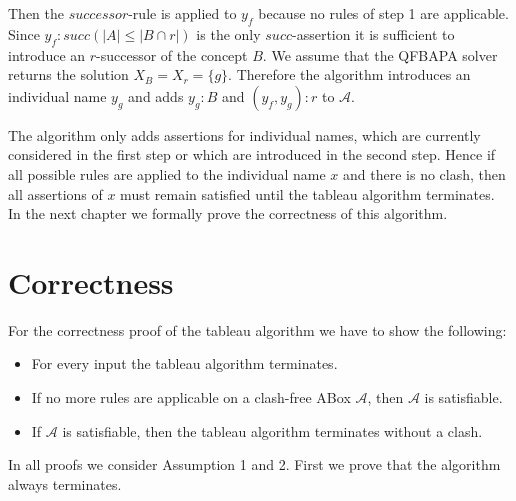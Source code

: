 \documentclass{book}
\theoremstyle{break}
\theoremstyle{definition}
\begin{document}
Then the $successor$-rule is applied to $y_f$ because no rules of step 1 are applicable. Since $y_f:succ(|A|\leq |B\cap r|)$ is the only $succ$-assertion it is sufficient to introduce an $r$-successor of the concept $B$. We assume that the QFBAPA solver returns the solution $X_B=X_r=\{g\}$. Therefore the algorithm introduces an individual name $y_g$ and adds $y_g:B$ and $(y_f,y_g):r$ to $\mathcal{A}$.
\begin{figure}[H]
\centering
{}
\end{figure}
The algorithm only adds assertions for individual names, which are currently considered in the first step or which are introduced in the second step. Hence if all possible rules are applied to the individual name $x$ and there is no clash, then all assertions of $x$ must remain satisfied until the tableau algorithm terminates. In the next chapter we formally prove the correctness of this algorithm.
\chapter{Correctness}
For the correctness proof of the tableau algorithm we have to show the following:
\begin{itemize}
\item For every input the tableau algorithm terminates.
\item If no more rules are applicable on a clash-free ABox $\mathcal{A}$, then $\mathcal{A}$ is satisfiable.
\item If $\mathcal{A}$ is satisfiable, then the tableau algorithm terminates without a clash.
\end{itemize}
In all proofs we consider Assumption 1 and 2. First we prove that the algorithm always terminates.
\end{document}

